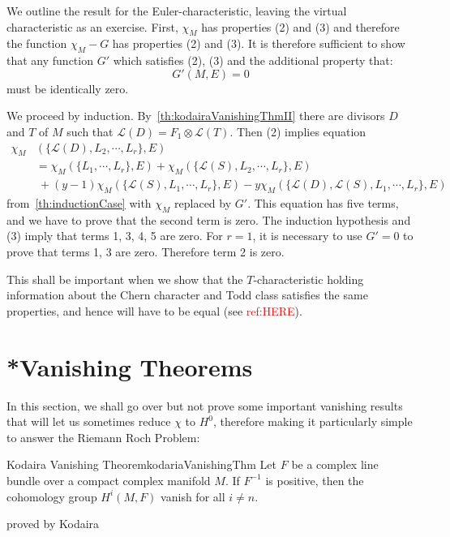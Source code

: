 \documentclass{book}
\newcommand{\CL}{{\mathcal{L}}}
\begin{document}
\begin{Proof}
  We outline the result for the Euler-characteristic, leaving the virtual characteristic as an exercise.
  First, $\chi_M$ has properties (2) and (3) and therefore the function $\chi_M-G$ has properties (2) and (3).
  It is therefore sufficient to show that any function $G'$ which satisfies (2), (3) and the additional property
  that:
  \[
    G'(M,E)=0
  \]
  must be identically zero.

  We proceed by induction. By~\cref{th:kodairaVanishingThmII} there are divisors $D$ and $T$ of $M$ such that $\CL(D)=F_1\otimes\CL(T)$.
  Then (2) implies equation
  \begin{align*}
    \chi_M&(\{ \CL(D),L_2,\cdots,L_r \},E)\\
    &= \chi_M(\{ L_1,\cdots,L_r \},E) + \chi_M(\{ \CL(S),L_2,\cdots,L_r \},E) \\
                        &\ + (y-1)\chi_M(\{\CL(S),L_1,\cdots,L_r\},E)
                        - y\chi_M(\{\CL(D),\CL(S),L_1,\cdots,L_r\},E)
  \end{align*}
  from~\cref{th:inductionCase} with $\chi_M$ replaced by $G'$. This equation has five terms, and we have to
  prove that the second term is zero. The induction hypothesis and (3) imply that terms 1, 3, 4, 5 are zero.
  For $r=1$, it is necessary to use $G'=0$ to prove that terms 1, 3 are zero. Therefore term 2 is zero.
\end{Proof}

This shall be important when we show that the $T$-characteristic holding information about the Chern character
and Todd class satisfies the same properties, and hence will have to be equal (see \textcolor{red}{ref:HERE}).

\section{*Vanishing Theorems}\label{sec:Kodaira}

In this section, we shall go over but not prove some important vanishing results that will let us sometimes
reduce $\chi$ to $H^0$, therefore making it particularly simple to answer the Riemann Roch Problem:
\begin{thm}{Kodaira Vanishing Theorem}{kodariaVanishingThm}
  Let $F$ be a complex line bundle over a compact complex manifold $M$. If $F^{-1}$ is positive, then the
  cohomology group $H^i(M, F)$ vanish for all $i \ne n$.
\end{thm}


\begin{Proof}
  proved by Kodaira
\end{Proof}
\end{document}
